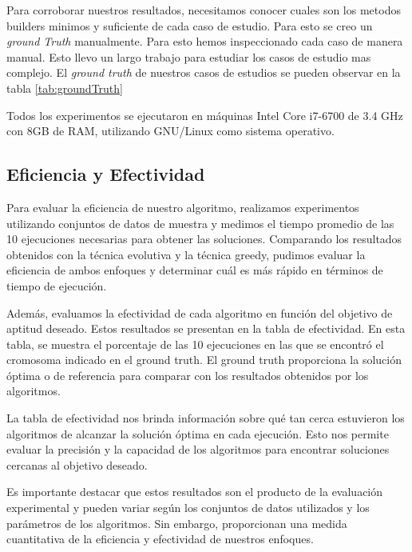 Para corroborar nuestros resultados, necesitamos conocer cuales son los metodos builders minimos y suficiente de cada caso de estudio. Para esto se creo un \emph{ground Truth} manualmente. Para esto hemos inspeccionado cada caso de manera manual. Esto llevo un largo trabajo para estudiar los casos de estudio mas complejo. El \emph{ground truth} de nuestros casos de estudios se pueden observar en la tabla \ref{tab:groundTruth}
    
Todos los experimentos se ejecutaron en máquinas Intel Core i7-6700 de 3.4 GHz con 8GB de RAM, utilizando GNU/Linux como sistema operativo.


\subsection{Eficiencia y Efectividad}


Para evaluar la eficiencia de nuestro algoritmo, realizamos experimentos utilizando conjuntos de datos de muestra y medimos el tiempo promedio de las 10 ejecuciones necesarias para obtener las soluciones. Comparando los resultados obtenidos con la técnica evolutiva y la técnica greedy, pudimos evaluar la eficiencia de ambos enfoques y determinar cuál es más rápido en términos de tiempo de ejecución.

Además, evaluamos la efectividad de cada algoritmo en función del objetivo de aptitud deseado. Estos resultados se presentan en la tabla de efectividad. En esta tabla, se muestra el porcentaje de las 10 ejecuciones en las que se encontró el cromosoma indicado en el ground truth. El ground truth proporciona la solución óptima o de referencia para comparar con los resultados obtenidos por los algoritmos.

La tabla de efectividad nos brinda información sobre qué tan cerca estuvieron los algoritmos de alcanzar la solución óptima en cada ejecución. Esto nos permite evaluar la precisión y la capacidad de los algoritmos para encontrar soluciones cercanas al objetivo deseado.

Es importante destacar que estos resultados son el producto de la evaluación experimental y pueden variar según los conjuntos de datos utilizados y los parámetros de los algoritmos. Sin embargo, proporcionan una medida cuantitativa de la eficiencia y efectividad de nuestros enfoques.

